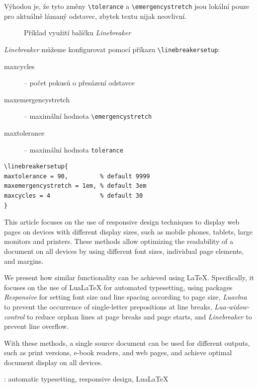 \documentclass{csbulletin}
\newcommand\balicek[1]{\textit{#1}}
\begin{document}
Výhodou je, že tyto změny \verb|\tolerance| a \verb|\emergencystretch| jsou lokální pouze 
pro aktuálně lámaný odstavec, zbytek textu nijak neovlivní. 


\begin{figure}
  \caption{Příklad využití balíčku \balicek{Linebreaker}}
  \label{fig:linebreaker}
\end{figure}


\balicek{Linebreaker} můžeme konfigurovat pomocí příkazu \verb|\linebreakersetup|:
  \begin{description}
    \item[maxcycles] – počet pokusů o přesázení odstavce
    \item[maxemergencystretch] – maximální hodnota \verb|\emergencystretch|
    \item[maxtolerance] – maximální hodnota \verb|tolerance|
  \end{description}

\begin{verbatim}
\linebreakersetup{
maxtolerance = 90,         % default 9999
maxemergencystretch = 1em, % default 3em
maxcycles = 4              % default 30
}
\end{verbatim}

\printbibliography

\begin{summary}
  This article focuses on the use of responsive design techniques to display
  web pages on devices with different display sizes, such as mobile phones,
  tablets, large monitors and printers. These methods allow optimizing the
  readability of a document on all devices by using different font sizes,
  individual page elements, and margins.

  We present how similar functionality can be achieved using \LaTeX.
  Specifically, it focuses on the use of Lua\LaTeX{} for automated typesetting,
  using packages \balicek{Responsive} for setting font size and line spacing according to page size,
  \balicek{Luavlna} to prevent the occurrence of
  single-letter prepositions at line breaks, \balicek{Lua-widow-control} to
  reduce orphan lines at page breaks and page starts, and \balicek{Linebreaker}
  to prevent line overflow.

  With these methods, a single source document can be used for different
  outputs, such as print versions, e-book readers, and web pages, and achieve
  optimal document display on all devices.

\keywords: automatic typesetting, responsive design, Lua\LaTeX
\end{summary}
\end{document}
